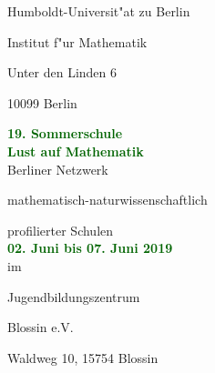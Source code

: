 \documentclass[10pt,a4paper, twoside]{article}
\theoremstyle{definition}
\theoremstyle{plain}
\numberwithin{equation}{subsection}
\begin{document}


\pagestyle{empty}


Humboldt-Universit"at zu Berlin

Institut f"ur Mathematik

Unter den Linden 6

10099 Berlin\\[12mm]

\begin{center}
\textcolor{darkgreen}{\Huge{\textbf{19. Sommerschule}}}\\[6mm]

\textcolor{darkgreen}{\Huge{\textbf{Lust auf Mathematik}}}\\[12mm]


\Large{Berliner Netzwerk}

\Large{mathematisch-naturwissenschaftlich}

\Large{profilierter Schulen}\\[6mm]

\textcolor{darkgreen}{\Huge{\textbf{02. Juni bis 07. Juni 2019}}}\\[6mm]

\Large{im}

\Large{Jugendbildungszentrum}

\Large{Blossin e.V.}

\Large{Waldweg 10,
15754 Blossin}\\[12mm]



\end{center}
\pagebreak
\( \)
\pagebreak


\begin{center}

\vspace{-4cm}


\end{center}


\pagebreak




\tableofcontents
\[\begin{array}{c}
\\
\end{array}\]

\pagebreak
\[\begin{array}{rcl}
\\
\end{array}\]
\end{document}
